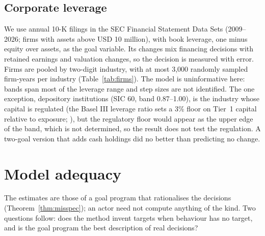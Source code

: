 \documentclass[11pt,a4paper]{article}
\theoremstyle{remark}\newtheorem{remark}{Remark}
\begin{document}
\subsection{Corporate leverage}\label{sec:firms}
We use annual 10-K filings in the SEC Financial Statement Data Sets (2009--2026; firms with assets above USD 10 million), with book leverage, one minus equity over assets, as the goal variable. Its changes mix financing decisions with retained earnings and valuation changes, so the decision is measured with error. Firms are pooled by two-digit industry, with at most 3,000 randomly sampled firm-years per industry (Table~\ref{tab:firms}). The model is uninformative here: bands span most of the leverage range and step sizes are not identified. The one exception, depository institutions (SIC 60, band 0.87--1.00), is the industry whose capital is regulated (the Basel III leverage ratio sets a 3\% floor on Tier~1 capital relative to exposure; \citealp{bcbs2014}), but the regulatory floor would appear as the upper edge of the band, which is not determined, so the result does not test the regulation. A two-goal version that adds cash holdings did no better than predicting no change.
\begin{table}[t]\centering\small
\caption{Book leverage, firms pooled by two-digit SIC industry; a dash marks a step that is not identified.}\label{tab:firms}\end{table}


\section{Model adequacy}\label{sec:adequacy}
The estimates are those of a goal program that rationalises the decisions (Theorem~\ref{thm:misspec}); an actor need not compute anything of the kind. Two questions follow: does the method invent targets when behaviour has no target, and is the goal program the best description of real decisions?
\end{document}
